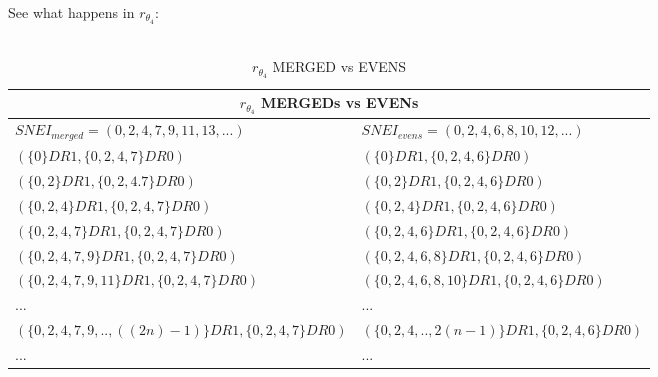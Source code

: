 	\newpage
	
	\noindent
	See what happens in $r_{\theta_{4}}$:
	\\\\
	\begin{table}[h!]
		\begin{center}
			\begin{tabular}{|l||l|}
				\hline
				\multicolumn{2}{|c|}{\cellcolor{lightgray} {$r_{\theta_{4}}$ MERGEDs vs EVENs } } \\
				\hline
				$SNEI_{merged} = (0,2,4,7,9,11,13,...)$ & $ SNEI_{evens} = (0,2,4,6,8,10,12,...)$   \\
				\hline
				\hline
				\cellcolor{applegreen!50}  $ ( \{0\}DR1, \{0,2,4,7\}DR0 ) $        & \cellcolor{applegreen!50}  $ ( \{0\}DR1, \{0,2,4,6\}DR0 ) $ \\
				\hline
				\cellcolor{applegreen!50}  $ ( \{0,2\}DR1, \{0,2,4.7\}DR0 ) $      & \cellcolor{applegreen!50}  $ ( \{0,2\}DR1, \{0,2,4,6\}DR0 ) $ \\
				\hline
				\cellcolor{applegreen!50}  $ ( \{0,2,4\}DR1, \{0,2,4,7\}DR0 ) $    & \cellcolor{applegreen!50}  $ ( \{0,2,4\}DR1, \{0,2,4,6\}DR0 ) $ \\
				\hline
				\cellcolor{applegreen!50} $ ( \{0,2,4,7\}DR1, \{0,2,4,7\}DR0 ) $   & \cellcolor{applegreen!50} $ ( \{0,2,4,6\}DR1, \{0,2,4,6\}DR0 ) $ \\
				\hline
				$ ( \{0,2,4,7,9\}DR1, \{0,2,4,7\}DR0 ) $                           & $ ( \{0,2,4,6,8\}DR1, \{0,2,4,6\}DR0 ) $ \\
				\hline
				$ ( \{0,2,4,7,9,11\}DR1, \{0,2,4,7\}DR0 ) $                        & $ ( \{0,2,4,6,8,10\}DR1, \{0,2,4,6\}DR0 ) $ \\
				\hline
				... & ... \\
				\hline
				$ (\{0,2,4,7,9,.., ((2n)-1)\}DR1, \{0,2,4,7\}DR0 )$                  & $ (\{0,2,4,.., 2(n-1) \}DR1, \{0,2,4,6\}DR0 )$ \\
				\hline
				... & ... \\
				\hline
				
			\end{tabular}
			\caption{$r_{\theta_{4}}$  MERGED vs EVENS}
			\label{tab: r_theta_4_merged_vs_evens}
		\end{center}
	\end{table}
	\\\\
	
